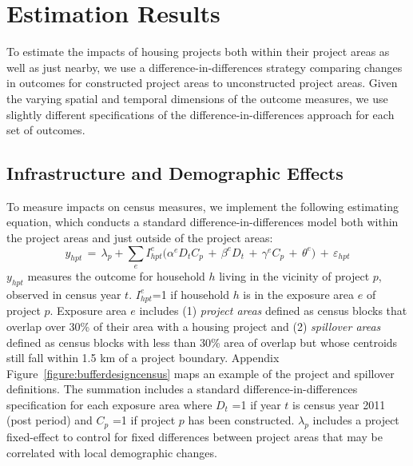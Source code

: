 \documentclass[12pt]{article}
\begin{document}



\section{Estimation Results}\label{section:results}

To estimate the impacts of housing projects both within their project areas as well as just nearby, we use a difference-in-differences strategy comparing changes in outcomes for constructed project areas to unconstructed project areas.  Given the varying spatial and temporal dimensions of the outcome measures, we use slightly different specifications of the difference-in-differences approach for each set of outcomes.

\subsection{Infrastructure and Demographic Effects}\label{section:resultscensus}

To measure impacts on census measures, we implement the following estimating equation, which conducts a standard difference-in-differences model both within the project areas and just outside of the project areas:
\begin{equation*}
y_{hpt} \, = \, \lambda_p + \sum\limits_{e} I^e_{hpt}\Big( \alpha^e D_tC_p \, + \, \beta^eD_t \, + \, \gamma^eC_p \, + \, \theta^e \Big) \, + \, \varepsilon_{hpt}
\end{equation*}
$y_{hpt}$ measures the outcome for household $h$ living in the vicinity of project $p$, observed in census year $t$.  $I^e_{hpt}$=1 if household $h$ is in the exposure area $e$ of project $p$.  Exposure area $e$ includes (1) {\it project areas} defined as census blocks that overlap over 30\% of their area with a housing project and (2) {\it spillover areas} defined as census blocks with less than 30\% area of overlap but whose centroids still fall within 1.5 km of a project boundary.  Appendix Figure~\ref{figure:bufferdesigncensus} maps an example of the project and spillover definitions.  The summation includes a standard difference-in-differences specification for each exposure area where $D_{t}\,\,$=1 if year $t$ is census year 2011 (post period) and $C_{p}\,\,$=1 if project $p$ has been constructed.  $\lambda_p$ includes a project fixed-effect to control for fixed differences between project areas that may be correlated with local demographic changes.  
\end{document}
